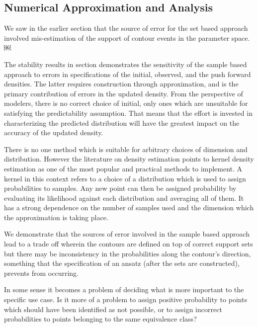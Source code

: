 \subsection{Numerical Approximation and Analysis}\label{sec:sample-approx}

We saw in the earlier section that the source of error for the set based approach involved mis-estimation of the support of contour events in the parameter space. ￼

The stability results in section demonstrates the sensitivity of the sample based approach to errors in specifications of the initial, observed, and the push forward densities.
The latter requires construction through approximation, and is the primary contribution of errors in the updated density.
From the perspective of modelers, there is no correct choice of initial, only ones which are unsuitable for satisfying the predictability assumption.
That means that the effort is invested in characterizing the predicted distribution will have the greatest impact on the accuracy of the updated density.

There is no one method which is suitable for arbitrary choices of dimension and distribution.
However the literature on density estimation points to kernel density estimation as one of the most popular and practical methods to implement.
A kernel in this context refers to a choice of a distribution which is used to assign probabilities to samples.
Any new point can then be assigned probability by evaluating its likelihood against each distribution and averaging all of them.
It has a strong dependence on the number of samples used and the dimension which the approximation is taking place.

We demonstrate that the sources of error involved in the sample based approach lead to a trade off wherein the contours are defined on top of correct support sets but there may be inconsistency in the probabilities along the contour's direction, something that the specification of an ansatz (after the sets are constructed), prevents from occurring.

In some sense it becomes a problem of deciding what is more important to the specific use case.
Is it more of a problem to assign positive probability to points which should have been identified as not possible, or to assign incorrect probabilities to points belonging to the same equivalence class?
